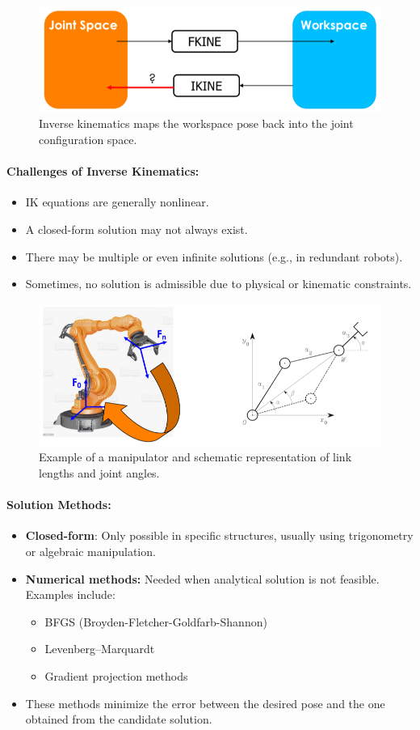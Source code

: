 \begin{figure}[H]
  \centering
  \includegraphics[width=0.6\linewidth]{imgs/ikine_mapping.png}
  \caption{Inverse kinematics maps the workspace pose back into the joint configuration space.}
\end{figure}

\paragraph{Challenges of Inverse Kinematics:}
\begin{itemize}
  \item IK equations are generally nonlinear.
  \item A closed-form solution may not always exist.
  \item There may be multiple or even infinite solutions (e.g., in redundant robots).
  \item Sometimes, no solution is admissible due to physical or kinematic constraints.
\end{itemize}

\begin{figure}[H]
  \centering
  \includegraphics[width=0.8\linewidth]{imgs/ikine_robot_diagram.png}
  \caption{Example of a manipulator and schematic representation of link lengths and joint angles.}
\end{figure}

\paragraph{Solution Methods:}
\begin{itemize}
  \item \textbf{Closed-form}: Only possible in specific structures, usually using trigonometry or algebraic manipulation.
  \item \textbf{Numerical methods:} Needed when analytical solution is not feasible. Examples include:
  \begin{itemize}
    \item BFGS (Broyden-Fletcher-Goldfarb-Shannon)
    \item Levenberg–Marquardt
    \item Gradient projection methods
  \end{itemize}
  \item These methods minimize the error between the desired pose and the one obtained from the candidate solution.
\end{itemize}


